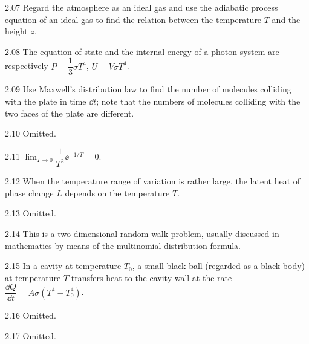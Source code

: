 \begin{hint}{2.07}
Regard the atmosphere as an ideal gas and use the adiabatic process equation of an ideal gas to find the relation between the temperature $T$ and the height $z$.
\end{hint}

\begin{hint}{2.08}
The equation of state and the internal energy of a photon system are respectively $P=\dfrac13\sigma T^4$, $U=V\sigma T^4$.
\end{hint}

\begin{hint}{2.09}
Use Maxwell's distribution law to find the number of molecules colliding with the plate in time $\dd t$; note that the numbers of molecules colliding with the two faces of the plate are different.
\end{hint}

\begin{hint}{2.10}
Omitted.
\end{hint}

\begin{hint}{2.11}
$\lim_{T\to0}\dfrac{1}{T^2}\ee^{-1/T}=0$.
\end{hint}

\begin{hint}{2.12}
When the temperature range of variation is rather large, the latent heat of phase change $L$ depends on the temperature $T$.
\end{hint}

\begin{hint}{2.13}
Omitted.
\end{hint}

\begin{hint}{2.14}
This is a two-dimensional random-walk problem, usually discussed in mathematics by means of the multinomial distribution formula.
\end{hint}

\begin{hint}{2.15}
In a cavity at temperature $T_0$, a small black ball (regarded as a black body) at temperature $T$ transfers heat to the cavity wall at the rate $\dfrac{\dd Q}{\dd t}=A\sigma(T^4-T_0^4)$.
\end{hint}

\begin{hint}{2.16}
Omitted.
\end{hint}

\begin{hint}{2.17}
Omitted.
\end{hint}

